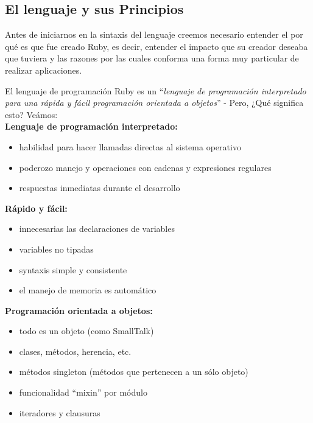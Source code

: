 \documentclass{article}
\begin{document}
\subsection{El lenguaje y sus Principios}
	
	Antes de iniciarnos en la sintaxis del lenguaje creemos necesario entender el por qué es que fue creado Ruby, es decir, entender el impacto que su creador deseaba que tuviera y las razones por las cuales conforma una forma muy particular de realizar aplicaciones.
	\par
	El lenguaje de programación Ruby es un ``\emph{lenguaje de programación interpretado para una rápida y fácil programación orientada a objetos}'' - Pero, ¿Qué significa esto? Veámos:
\bigskip\\

\textbf{Lenguaje de programación interpretado:}
\begin{itemize}
	\itemsep=1pt \topsep=0pt \partopsep=0pt \parskip=0pt \parsep=0pt
	\item habilidad para hacer llamadas directas al sistema operativo
	\item poderozo manejo y operaciones con cadenas y expresiones regulares
	\item respuestas inmediatas durante el desarrollo
\end{itemize}
\medskip

\textbf{Rápido y fácil:}
\begin{itemize}
\itemsep=2pt \topsep=0pt \partopsep=0pt \parskip=0pt \parsep=0pt
	\item innecesarias las declaraciones de variables
	\item variables no tipadas
	\item syntaxis simple y consistente
	\item el manejo de memoria es automático
\end{itemize}
\medskip

\textbf{Programación orientada a objetos:}
\begin{itemize}
\itemsep=2pt \topsep=0pt \partopsep=0pt \parskip=0pt \parsep=0pt
	\item todo es un objeto (como SmallTalk)
	\item clases, métodos, herencia, etc.
	\item métodos singleton (métodos que pertenecen a un sólo objeto)
	\item funcionalidad ``mixin'' por módulo
	\item iteradores y clausuras
\end{itemize}
\medskip
\end{document}
